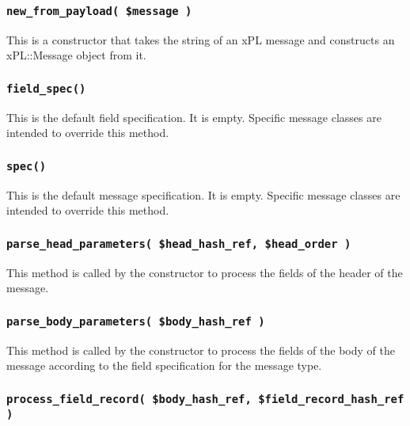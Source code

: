 \documentclass[12pt,a4paper]{article}
\begin{document}
\subsubsection*{\texttt{new\_from\_payload( \$message )}\label{xPL::Message_new_from_payload_message_}}


This is a constructor that takes the string of an xPL message and
constructs an xPL::Message object from it.

\subsubsection*{\texttt{field\_spec()}\label{xPL::Message_field_spec_}}


This is the default field specification.  It is empty.  Specific
message classes are intended to override this method.

\subsubsection*{\texttt{spec()}\label{xPL::Message_spec_}}


This is the default message specification.  It is empty.  Specific
message classes are intended to override this method.

\subsubsection*{\texttt{parse\_head\_parameters( \$head\_hash\_ref, \$head\_order )}\label{xPL::Message_parse_head_parameters_head_hash_ref_head_order_}}


This method is called by the constructor to process the fields of the
header of the message.

\subsubsection*{\texttt{parse\_body\_parameters( \$body\_hash\_ref )}\label{xPL::Message_parse_body_parameters_body_hash_ref_}}


This method is called by the constructor to process the fields of the
body of the message according to the field specification for the
message type.

\subsubsection*{\texttt{process\_field\_record( \$body\_hash\_ref, \$field\_record\_hash\_ref )}\label{xPL::Message_process_field_record_body_hash_ref_field_record_hash_ref_}}
\end{document}

